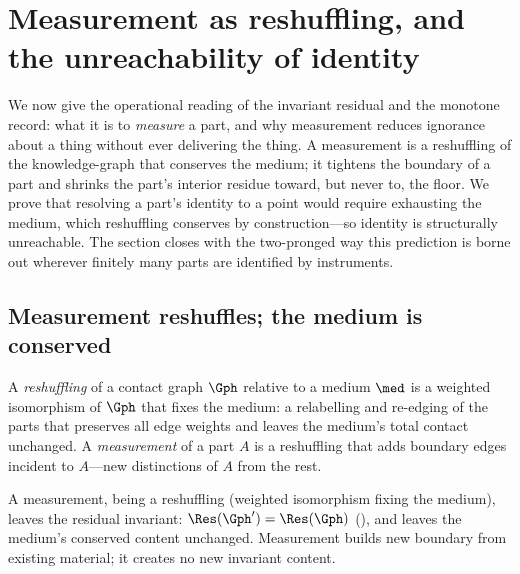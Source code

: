 
\section{Measurement as reshuffling, and the unreachability of identity}
\label{sec:measurement}

We now give the operational reading of the invariant residual and the monotone
record: what it is to \emph{measure} a part, and why measurement reduces ignorance
about a thing without ever delivering the thing. A measurement is a reshuffling of
the knowledge-graph that conserves the medium; it tightens the boundary of a part
and shrinks the part's interior residue toward, but never to, the floor. We prove
that resolving a part's identity to a point would require exhausting the medium,
which reshuffling conserves by construction---so identity is structurally
unreachable. The section closes with the two-pronged way this prediction is borne
out wherever finitely many parts are identified by instruments.

\subsection{Measurement reshuffles; the medium is conserved}

\begin{definition}[Reshuffling]
\label{def:reshuffle}
A \emph{reshuffling} of a contact graph $\Gph$ relative to a medium $\med$ is a
weighted isomorphism of $\Gph$ that fixes the medium: a relabelling and
re-edging of the parts that preserves all edge weights and leaves the medium's
total contact unchanged. A \emph{measurement} of a part $A$ is a reshuffling that
adds boundary edges incident to $A$---new distinctions of $A$ from the rest.
\end{definition}

\begin{proposition}
\label{prop:measure-conserves}
A measurement, being a reshuffling \textup{(}weighted isomorphism fixing the
medium\textup{)}, leaves the residual invariant: $\Res(\Gph')=\Res(\Gph)$
\textup{(}\textup{)}, and leaves the medium's
conserved content unchanged. Measurement builds new boundary from existing
material; it creates no new invariant content.
\end{proposition}

